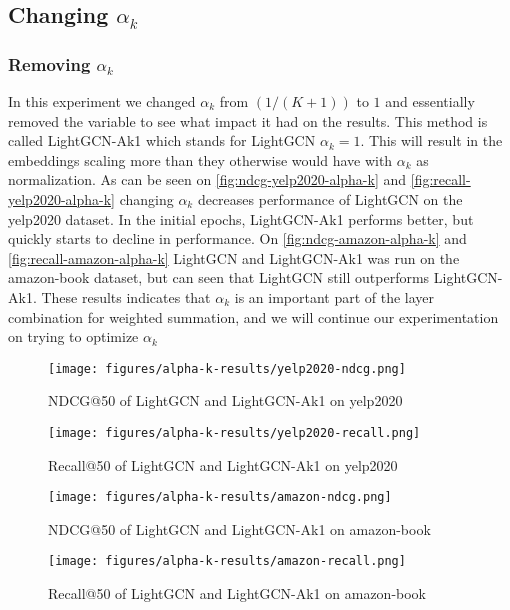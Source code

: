 \subsection{Changing $\alpha_k$}

\subsubsection{Removing $\alpha_k$}\label{subsubsec:remove-alpha-k}
In this experiment we changed $\alpha_k$ from $(1 / (K + 1))$ to $1$ and essentially removed the variable to see what impact it had on the results.
This method is called LightGCN-Ak1 which stands for LightGCN $\alpha_k = 1$.
This will result in the embeddings scaling more than they otherwise would have with $\alpha_k$ as normalization.
As can be seen on \autoref{fig:ndcg-yelp2020-alpha-k} and \autoref{fig:recall-yelp2020-alpha-k} changing $\alpha_k$ decreases performance of LightGCN on the yelp2020 dataset.
In the initial epochs, LightGCN-Ak1 performs better, but quickly starts to decline in performance.
On \autoref{fig:ndcg-amazon-alpha-k} and \autoref{fig:recall-amazon-alpha-k} LightGCN and LightGCN-Ak1 was run on the amazon-book dataset, but can seen that LightGCN still outperforms LightGCN-Ak1.
These results indicates that $\alpha_k$ is an important part of the layer combination for weighted summation, and we will continue our experimentation on trying to optimize $\alpha_k$
\begin{figure}
    \texttt{[image: figures/alpha-k-results/yelp2020-ndcg.png]}
    \caption{NDCG@50 of LightGCN and LightGCN-Ak1 on yelp2020}
    \label{fig:ndcg-yelp2020-alpha-k}
\end{figure}
\begin{figure}
    \texttt{[image: figures/alpha-k-results/yelp2020-recall.png]}
    \caption{Recall@50 of LightGCN and LightGCN-Ak1 on yelp2020}
    \label{fig:recall-yelp2020-alpha-k}
\end{figure}
\begin{figure}
    \texttt{[image: figures/alpha-k-results/amazon-ndcg.png]}
    \caption{NDCG@50 of LightGCN and LightGCN-Ak1 on amazon-book}
    \label{fig:ndcg-amazon-alpha-k}
\end{figure}
\begin{figure}
    \texttt{[image: figures/alpha-k-results/amazon-recall.png]}
    \caption{Recall@50 of LightGCN and LightGCN-Ak1 on amazon-book}
    \label{fig:recall-amazon-alpha-k}
\end{figure}
